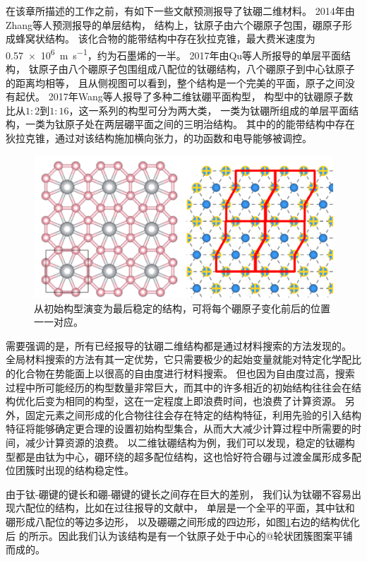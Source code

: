 在该章所描述的工作之前，有如下一些文献预测报导了钛硼二维材料。
2014年由Zhang等人\cite{zhang2014prediction}预测报导的单层结构，
结构上，钛原子由六个硼原子包围，硼原子形成蜂窝状结构。
该化合物的能带结构中存在狄拉克锥，最大费米速度为\SI{0.57e6}{\meter\per\second}，约为石墨烯的一半。
2017年由Qu等人\cite{qu2017two}所报导的单层平面结构，
钛原子由八个硼原子包围组成八配位的钛硼结构，八个硼原子到中心钛原子的距离均相等，
且从侧视图可以看到，整个结构是一个完美的平面，原子之间没有起伏。
2017年Wang等人\cite{wang2017semimetallic}报导了多种二维钛硼平面构型，
构型中的钛硼原子数比从$1:2$到$1:16$，这一系列的构型可分为两大类，
一类为钛硼所组成的单层平面结构，一类为钛原子处在两层硼平面之间的三明治结构。
其中的的能带结构中存在狄拉克锥，通过对该结构施加横向张力，的功函数和电导能够被调控。

\begin{figure}[htb]
  \includegraphics[width=1.0\textwidth]{figs/ch4_cell_change.png}
  \centering
  \caption{从初始构型演变为最后稳定的结构，可将每个硼原子变化前后的位置一一对应。}
  \label{fig:ch4_cell_change}
\end{figure}

需要强调的是，所有已经报导的钛硼二维结构都是通过材料搜索的方法发现的。
全局材料搜索的方法有其一定优势，它只需要极少的起始变量就能对特定化学配比的化合物在势能面上以很高的自由度进行材料搜索。
但也因为自由度过高，搜索过程中所可能经历的构型数量非常巨大，而其中的许多相近的初始结构往往会在结构优化后变为相同的构型，这在一定程度上即浪费时间，也浪费了计算资源。
另外，固定元素之间形成的化合物往往会存在特定的结构特征，利用先验的引入结构特征将能够确定更合理的设置初始构型集合，从而大大减少计算过程中所需要的时间，减少计算资源的浪费。
以二维钛硼结构为例，我们可以发现，稳定的钛硼构型都是由钛为中心，硼环绕的超多配位结构，这也恰好符合硼与过渡金属形成多配位团簇时出现的结构稳定性。

由于钛-硼键的键长和硼-硼键的键长之间存在巨大的差别，
我们认为钛硼不容易出现六配位的结构，比如在过往报导的文献中，
单层是一个全平的平面，其中钛和硼形成八配位的等边多边形，
以及硼硼之间形成的四边形，如图\ref{fig:ch4_cell_change}右边的结构优化后
的所示。因此我们认为该结构是有一个钛原子处于中心的@轮状团簇图案平铺而成的。

